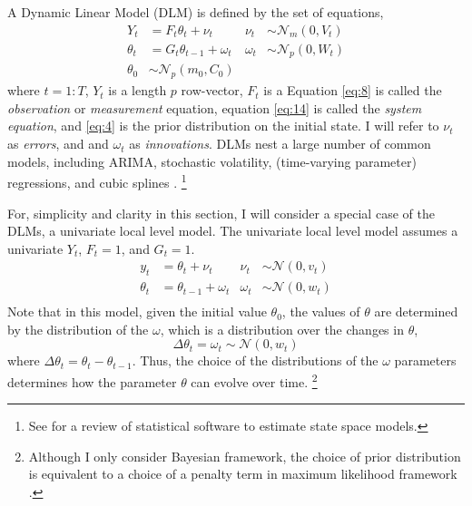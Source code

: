\documentclass{article}
\newcommand{\paren}[1]{\ensuremath{\left(#1\right)}}
\newcommand{\dnorm}[1]{\ensuremath{\mathcal{N}\paren{#1}}}
\newcommand{\dmvnorm}[2]{\ensuremath{\mathcal{N}_{#2}\paren{#1}}}
\begin{document}
A Dynamic Linear Model (DLM) is defined by the set of equations,
\begin{align}
  \label{eq:8}
  Y_t &= F_{t} \theta_t + \nu_t & \nu_{t} &\sim \dmvnorm{0, V_{t}}{m} \\
  \label{eq:14}
  \theta_t &= G_{t} \theta_{t-1} + \omega_{t} & \omega_{t} &\sim \dmvnorm{0, W_{t}}{p} \\
  \label{eq:2}
  \theta_{0} & \sim \dmvnorm{m_{0}, C_{0}}{p}
\end{align}  
where $t = 1:T$, $Y_{t}$ is a length $p$ row-vector, $F_{t}$ is a 
Equation \eqref{eq:8} is called the \textit{observation} or \textit{measurement} equation, 
equation \eqref{eq:14} is called the \textit{system equation},
and \eqref{eq:4} is the prior distribution on the initial state.
I will refer to $\nu_{t}$ as \textit{errors}, and and $\omega_{t}$ as \textit{innovations}.
DLMs nest a large number of common models, including ARIMA, stochastic volatility, (time-varying parameter) regressions,
and cubic splines \parencites{WestHarrison1997}{DurbinKoopman2001}{ShumwayStoffer2010}{CommandeurKoopman2007}.%
\footnote{See \textcite{CommandeurKoopmanOoms2011} for a review of statistical software to estimate state space models.}

For, simplicity and clarity in this section, I will consider a special case of the DLMs, a univariate local level model.
The univariate local level model assumes a univariate $Y_{t}$, $F_{t} = 1$, and $G_{t} = 1$.
\begin{align}
  \label{eq:15}
  y_t &= \theta_t + \nu_t & \nu_{t} &\sim \dnorm{0, v_{t}} \\
  \label{eq:16}
  \theta_t &= \theta_{t-1} + \omega_{t} & \omega_{t} &\sim \dnorm{0, w_{t}} \\
\end{align}
Note that in this model, given the initial value $\theta_{0}$, the values of $\theta$ are determined by the distribution of the $\omega$, which is a distribution over the changes in $\theta$,
\begin{equation}
  \label{eq:12}
  \Delta \theta_{t} = \omega_{t} \sim \dnorm{0, w_{t}}
\end{equation}
where $\Delta \theta_{t} = \theta_{t} - \theta_{t - 1}$.
Thus, the choice of the distributions of the $\omega$ parameters determines how the parameter $\theta$ can evolve over time.%
\footnote{Although I only consider Bayesian framework, the choice of prior distribution is equivalent to a choice of a penalty term in maximum likelihood framework \parencite{PolsonScott2010}.}
\end{document}

